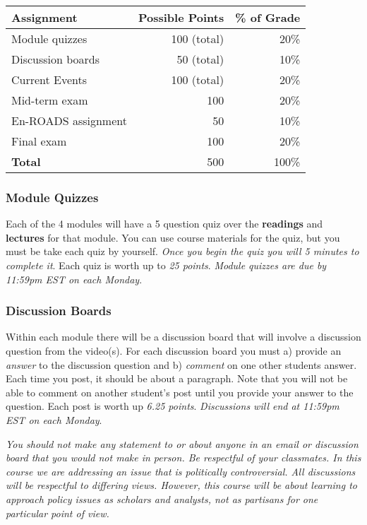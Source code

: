 \vspace{0.15in}

\begin{tabular}{l | r | r}
\hline
Assignment & Possible Points & \% of Grade \\
\hline
Module quizzes & 100 (total) & 20\%  \\
Discussion boards & 50 (total) & 10\%  \\
Current Events & 100 (total) & 20\% \\
Mid-term exam & 100 & 20\% \\
En-ROADS assignment & 50 & 10\% \\
Final exam  & 100 & 20\% \\
\hline
\textbf{Total} & 500 & 100\% \\
\hline
\end{tabular}

\hypertarget{module-quizzes}{%
\subsubsection{Module Quizzes}\label{module-quizzes}}

Each of the 4 modules will have a 5 question quiz over the
\textbf{readings} and \textbf{lectures} for that module. You can use
course materials for the quiz, but you must be take each quiz by
yourself. \emph{Once you begin the quiz you will 5 minutes to complete
it}. Each quiz is worth up to \emph{25 points}. \emph{Module quizzes are
due by 11:59pm EST on each Monday}.

\hypertarget{discussion-boards}{%
\subsubsection{Discussion Boards}\label{discussion-boards}}

Within each module there will be a discussion board that will involve a
discussion question from the video(s). For each discussion board you
must a) provide an \emph{answer} to the discussion question and b)
\emph{comment} on one other students answer. Each time you post, it
should be about a paragraph. Note that you will not be able to comment
on another student's post until you provide your answer to the question.
Each post is worth up \emph{6.25 points}. \emph{Discussions will end at
11:59pm EST on each Monday}.

\vspace{0.1in}

\noindent \emph{You should not make any statement to or about anyone in
an email or discussion board that you would not make in person. Be
respectful of your classmates. In this course we are addressing an issue
that is politically controversial. All discussions will be respectful to
differing views. However, this course will be about learning to approach
policy issues as scholars and analysts, not as partisans for one
particular point of view.}

